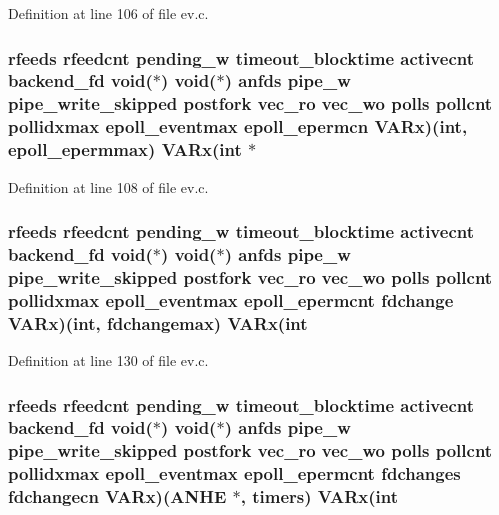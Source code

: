 \-Definition at line 106 of file ev.\-c.

\hypertarget{structev__loop_aaf1f0d776092ea9d95e0eeffa591cad7}{
\subsubsection[{\-V\-A\-Rx}]{ {\bf rfeeds} {\bf rfeedcnt} {\bf pending\-\_\-w} {\bf timeout\-\_\-blocktime} {\bf activecnt} {\bf backend\-\_\-fd} void($\ast$) void($\ast$) {\bf anfds} {\bf pipe\-\_\-w} {\bf pipe\-\_\-write\-\_\-skipped} {\bf postfork} {\bf vec\-\_\-ro} {\bf vec\-\_\-wo} {\bf polls} {\bf pollcnt} {\bf pollidxmax} {\bf epoll\-\_\-eventmax} epoll\-\_\-epermcn {\bf \-V\-A\-Rx})(int, {\bf epoll\-\_\-epermmax}) {\bf \-V\-A\-Rx}(int $\ast$}}\label{structev__loop_aaf1f0d776092ea9d95e0eeffa591cad7}


\-Definition at line 108 of file ev.\-c.

\hypertarget{structev__loop_a9a1ed06fa2b171a02732f96b0865f396}{
\subsubsection[{\-V\-A\-Rx}]{ {\bf rfeeds} {\bf rfeedcnt} {\bf pending\-\_\-w} {\bf timeout\-\_\-blocktime} {\bf activecnt} {\bf backend\-\_\-fd} void($\ast$) void($\ast$) {\bf anfds} {\bf pipe\-\_\-w} {\bf pipe\-\_\-write\-\_\-skipped} {\bf postfork} {\bf vec\-\_\-ro} {\bf vec\-\_\-wo} {\bf polls} {\bf pollcnt} {\bf pollidxmax} {\bf epoll\-\_\-eventmax} {\bf epoll\-\_\-epermcnt} fdchange {\bf \-V\-A\-Rx})(int, {\bf fdchangemax}) {\bf \-V\-A\-Rx}(int}}\label{structev__loop_a9a1ed06fa2b171a02732f96b0865f396}


\-Definition at line 130 of file ev.\-c.

\hypertarget{structev__loop_a111b2f2e5e9b29ca107897c880cd3a66}{
\subsubsection[{\-V\-A\-Rx}]{ {\bf rfeeds} {\bf rfeedcnt} {\bf pending\-\_\-w} {\bf timeout\-\_\-blocktime} {\bf activecnt} {\bf backend\-\_\-fd} void($\ast$) void($\ast$) {\bf anfds} {\bf pipe\-\_\-w} {\bf pipe\-\_\-write\-\_\-skipped} {\bf postfork} {\bf vec\-\_\-ro} {\bf vec\-\_\-wo} {\bf polls} {\bf pollcnt} {\bf pollidxmax} {\bf epoll\-\_\-eventmax} {\bf epoll\-\_\-epermcnt} {\bf fdchanges} fdchangecn {\bf \-V\-A\-Rx})({\bf \-A\-N\-H\-E} $\ast$, {\bf timers}) {\bf \-V\-A\-Rx}(int}}\label{structev__loop_a111b2f2e5e9b29ca107897c880cd3a66}


